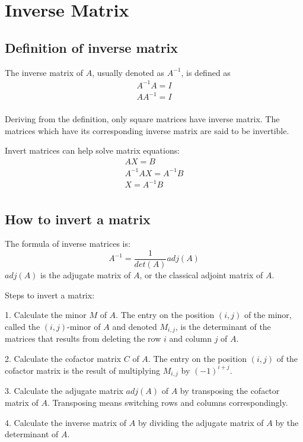 \documentclass{article}
\begin{document}
\section{Inverse Matrix}

\subsection{Definition of inverse matrix}

The inverse matrix of $A$, usually denoted as $A^{-1}$, is defined as
\begin{gather*}
  A^{-1}A = I \\
  AA^{-1} = I \\
\end{gather*}

Deriving from the definition, only square matrices have inverse matrix. The 
matrices which have its corresponding inverse matrix are said to be invertible.

Invert matrices can help solve matrix equations:
\begin{gather*}
  AX = B \\
  A^{-1}AX = A^{-1}B \\
  X = A^{-1}B \\
\end{gather*}

\subsection{How to invert a matrix}

The formula of inverse matrices is:
\[
  A^{-1} = \frac{1}{det(A)}adj(A)
\]
$adj(A)$ is the adjugate matrix of $A$, or the classical adjoint matrix of $A$.

\bigskip

Steps to invert a matrix:

1. Calculate the minor $M$ of $A$. The entry on the position $(i,j)$ of the 
minor, called the $(i,j)$-minor of $A$ and denoted $M_{i,j}$, is the determinant 
of the matrices that results from deleting the row $i$ and column $j$ of $A$.

2. Calculate the cofactor matrix $C$ of $A$. The entry on the position $(i,j)$ 
of the cofactor matrix is the result of multiplying $M_{i,j}$ by $(-1)^{i+j}$.

3. Calculate the adjugate matrix $adj(A)$ of $A$ by transposing the cofactor 
matrix of $A$. Transposing means switching rows and columns correspondingly.

4. Calculate the inverse matrix of $A$ by dividing the adjugate matrix of $A$ by the determinant of $A$.
\end{document}
